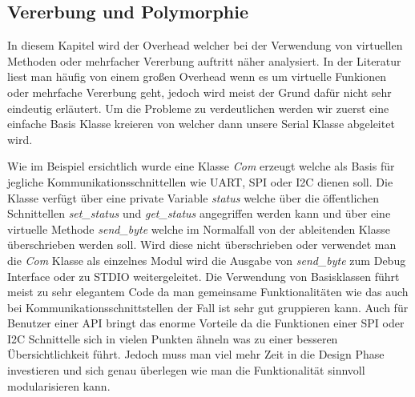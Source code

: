 \documentclass[MES,Master,ngerman]{twbook}%
\begin{document}
\subsection{Vererbung und Polymorphie}
In diesem Kapitel wird der Overhead welcher bei der Verwendung von virtuellen Methoden oder mehrfacher Vererbung auftritt näher analysiert. In der Literatur liest man häufig von einem großen Overhead wenn es um virtuelle Funkionen oder mehrfache Vererbung geht, jedoch wird meist der Grund dafür nicht sehr eindeutig erläutert. Um die Probleme zu verdeutlichen werden wir zuerst eine einfache Basis Klasse kreieren von welcher dann unsere Serial Klasse abgeleitet wird.

\begin{figure}[!htb]
	\begin{subfigure}[b]{0.5\textwidth}
		
		\label{fig:30}
	\end{subfigure}
	\begin{subfigure}[b]{0.5\textwidth}
		
		\label{fig:31}
	\end{subfigure}
\end{figure}

Wie im Beispiel ersichtlich wurde eine Klasse \textit{Com} erzeugt welche als Basis für jegliche Kommunikationsschnittellen wie UART, SPI oder I2C dienen soll. Die Klasse verfügt über eine private Variable \textit{status} welche über die öffentlichen Schnittellen \textit{set\_status} und \textit{get\_status} angegriffen werden kann und über eine virtuelle Methode \textit{send\_byte} welche im Normalfall von der ableitenden Klasse überschrieben werden soll. Wird diese nicht überschrieben oder verwendet man die \textit{Com} Klasse als einzelnes Modul wird die Ausgabe von \textit{send\_byte} zum Debug Interface oder zu STDIO weitergeleitet. \newline \newline Die Verwendung von Basisklassen führt meist zu sehr elegantem Code da man gemeinsame Funktionalitäten wie das auch bei Kommunikationsschnittstellen der Fall ist sehr gut gruppieren kann. Auch für Benutzer einer API bringt das enorme Vorteile da die Funktionen einer SPI oder I2C Schnittelle sich in vielen Punkten ähneln was zu einer besseren Übersichtlichkeit führt. Jedoch muss man viel mehr Zeit in die Design Phase investieren und sich genau überlegen wie man die Funktionalität sinnvoll modularisieren kann. 
\end{document}
